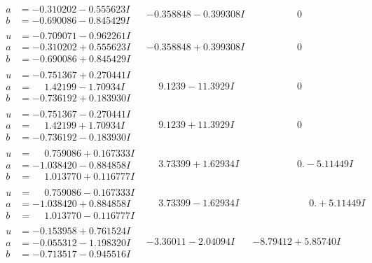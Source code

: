 \documentclass[1p]{elsarticle_modified}
\theoremstyle{definition}
\begin{document}
$$\begin{array}{c|c|c}
\begin{aligned}
a &= -0.310202 - 0.555623 I \\
b &= -0.690086 - 0.845429 I\end{aligned}
 & -0.358848 - 0.399308 I & \phantom{-0.000000 } 0 \\ \hline\begin{aligned}
u &= -0.709071 - 0.962261 I \\
a &= -0.310202 + 0.555623 I \\
b &= -0.690086 + 0.845429 I\end{aligned}
 & -0.358848 + 0.399308 I & \phantom{-0.000000 } 0 \\ \hline\begin{aligned}
u &= -0.751367 + 0.270441 I \\
a &= \phantom{-}1.42199 - 1.70934 I \\
b &= -0.736192 + 0.183930 I\end{aligned}
 & \phantom{-}9.1239 - 11.3929 I & \phantom{-0.000000 } 0 \\ \hline\begin{aligned}
u &= -0.751367 - 0.270441 I \\
a &= \phantom{-}1.42199 + 1.70934 I \\
b &= -0.736192 - 0.183930 I\end{aligned}
 & \phantom{-}9.1239 + 11.3929 I & \phantom{-0.000000 } 0 \\ \hline\begin{aligned}
u &= \phantom{-}0.759086 + 0.167333 I \\
a &= -1.038420 - 0.884858 I \\
b &= \phantom{-}1.013770 + 0.116777 I\end{aligned}
 & \phantom{-}3.73399 + 1.62934 I & \phantom{-0.000000 } 0. - 5.11449 I \\ \hline\begin{aligned}
u &= \phantom{-}0.759086 - 0.167333 I \\
a &= -1.038420 + 0.884858 I \\
b &= \phantom{-}1.013770 - 0.116777 I\end{aligned}
 & \phantom{-}3.73399 - 1.62934 I & \phantom{-0.000000 -}0. + 5.11449 I \\ \hline\begin{aligned}
u &= -0.153958 + 0.761524 I \\
a &= -0.055312 - 1.198320 I \\
b &= -0.713517 - 0.945516 I\end{aligned}
 & -3.36011 - 2.04094 I & -8.79412 + 5.85740 I\\

\end{array}$$
\end{document}
